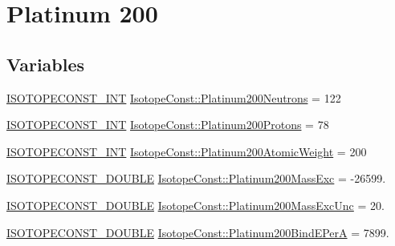\hypertarget{group___isotope_const-_platinum-_pt200}{}\section{Platinum 200}
\label{group___isotope_const-_platinum-_pt200}
\subsection*{Variables}
\begin{DoxyCompactItemize}
\item 
\mbox{\hyperlink{group___isotope_const-_macros_ga5f18360b3e99483a35c32d789e62621c}{I\+S\+O\+T\+O\+P\+E\+C\+O\+N\+S\+T\+\_\+\+I\+NT}} \mbox{\hyperlink{group___isotope_const-_platinum-_pt200_ga817a856a1b7abe7c462949c0d42c45d3}{Isotope\+Const\+::\+Platinum200\+Neutrons}} = 122
\item 
\mbox{\hyperlink{group___isotope_const-_macros_ga5f18360b3e99483a35c32d789e62621c}{I\+S\+O\+T\+O\+P\+E\+C\+O\+N\+S\+T\+\_\+\+I\+NT}} \mbox{\hyperlink{group___isotope_const-_platinum-_pt200_ga27d7046c1d586c2d274edc1bd9c1f705}{Isotope\+Const\+::\+Platinum200\+Protons}} = 78
\item 
\mbox{\hyperlink{group___isotope_const-_macros_ga5f18360b3e99483a35c32d789e62621c}{I\+S\+O\+T\+O\+P\+E\+C\+O\+N\+S\+T\+\_\+\+I\+NT}} \mbox{\hyperlink{group___isotope_const-_platinum-_pt200_ga94ea6e2d4b1cb3d40ea85bb42afdee39}{Isotope\+Const\+::\+Platinum200\+Atomic\+Weight}} = 200
\item 
\mbox{\hyperlink{group___isotope_const-_macros_ga8f45a7272ce02c0b4c65c44636ed719a}{I\+S\+O\+T\+O\+P\+E\+C\+O\+N\+S\+T\+\_\+\+D\+O\+U\+B\+LE}} \mbox{\hyperlink{group___isotope_const-_platinum-_pt200_ga9a860449daf70ae079b7e221f1f6c2c1}{Isotope\+Const\+::\+Platinum200\+Mass\+Exc}} = -\/26599.
\item 
\mbox{\hyperlink{group___isotope_const-_macros_ga8f45a7272ce02c0b4c65c44636ed719a}{I\+S\+O\+T\+O\+P\+E\+C\+O\+N\+S\+T\+\_\+\+D\+O\+U\+B\+LE}} \mbox{\hyperlink{group___isotope_const-_platinum-_pt200_ga3457809ae6cc8d4ba6c8777d591c2cf0}{Isotope\+Const\+::\+Platinum200\+Mass\+Exc\+Unc}} = 20.
\item 
\mbox{\hyperlink{group___isotope_const-_macros_ga8f45a7272ce02c0b4c65c44636ed719a}{I\+S\+O\+T\+O\+P\+E\+C\+O\+N\+S\+T\+\_\+\+D\+O\+U\+B\+LE}} \mbox{\hyperlink{group___isotope_const-_platinum-_pt200_ga07ed13c64542bc070cb3d8d0350e1c18}{Isotope\+Const\+::\+Platinum200\+Bind\+E\+PerA}} = 7899.
\item 

\end{DoxyCompactItemize}
